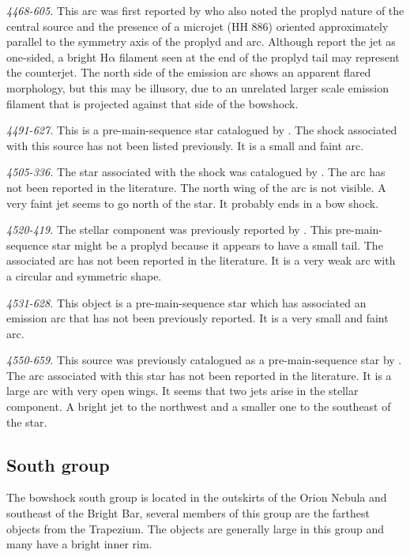 \documentclass[apj, twocolumn]{aastex63}
\newcommand\ha{\ensuremath{\mathrm{H\alpha}}}
\renewcommand\clearpage{}
\begin{document}
\textit{4468-605.}  This arc was first reported by \citet{Bally:2006a}
who also noted the proplyd nature of the central source and the
presence of a microjet (HH 886) oriented approximately parallel to the
symmetry axis of the proplyd and arc.  Although \citet{Bally:2006a}
report the jet as one-sided, a bright \ha{} filament seen at the end
of the proplyd tail may represent the counterjet.  The north side of
the emission arc shows an apparent flared morphology, but this may be
illusory, due to an unrelated larger scale emission filament that is
projected against that side of the bowshock.

\textit{4491-627.} This is a pre-main-sequence star catalogued by
\citet{Parihar:2009}. The shock associated with this source has not been
listed previously. It is a small and faint arc.

\textit{4505-336.} The star associated with the shock was catalogued
by \citet{Hillenbrand:1997}. The arc has not been reported in the
literature. The north wing of the arc is not visible. A very faint jet
seems to go north of the star. It probably ends in a bow shock.

\textit{4520-419.} The stellar component was previously reported
by \citet{Parihar:2009}. This pre-main-sequence star might be a proplyd
because it appears to have a small tail. The associated arc has not been
reported in the literature. It is a very weak arc with a circular and
symmetric shape.

\textit{4531-628.} This object is a pre-main-sequence star \citep{Da-Rio:2009a}
which has associated an emission arc that has not been previously reported.
It is a very small and faint arc.

\textit{4550-659.} This source was previously catalogued as a pre-main-sequence
star by \citet{Parihar:2009}. The arc associated with this star has not been
reported in the literature. It is a large arc with very open wings. It seems
that two jets arise in the stellar component. A bright jet to the northwest
and a smaller one to the southeast of the star.  


\clearpage
\subsection{South group}
\label{sec:s-group}



The bowshock south group is located in the outskirts of the Orion
Nebula and southeast of the Bright Bar, several members of this
group are the farthest objects from the Trapezium. The objects
are generally large in this group and many have a bright inner rim.   
\end{document}
